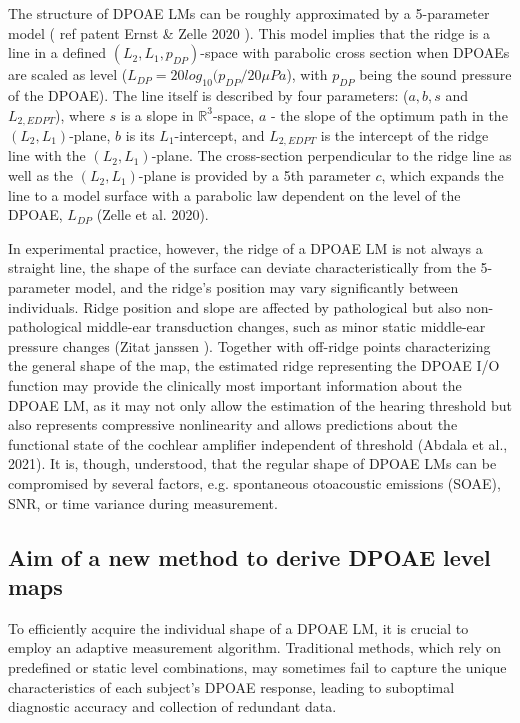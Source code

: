 \documentclass[journal,twoside,web]{ieeecolor2}
\begin{document}
The structure of DPOAE LMs can be roughly approximated by a 5-parameter model ( ref patent Ernst \& Zelle 2020 ). This model implies that the ridge is a line in a defined $(L_2, L_1, p_{DP})$-space with parabolic cross section when DPOAEs are scaled as level ($L_{DP}=20 log_{10} (p_{DP}/20 \mu Pa$), with $p_{DP}$ being the sound pressure of the DPOAE). The line itself is described by four parameters: ($a, b, s$ and $L_{2,EDPT}$), where $s$ is a slope in $\mathbb{R}^3$-space, $a$ - the slope of the optimum path in the $(L_2, L_1)$-plane, $b$ is its $L_1$-intercept, and $L_{2,EDPT}$ is the intercept of the ridge line with the $(L_2, L_1)$-plane. The cross-section perpendicular to the ridge line as well as the $(L_2, L_1)$-plane is provided by a 5th parameter $c$, which expands the line to a model surface with a parabolic law dependent on the level of the DPOAE, $L_{DP}$ (Zelle et al. 2020).

In experimental practice, however, the ridge of a DPOAE LM is not always a straight line, the shape of the surface can deviate characteristically from the 5-parameter model, and the ridge’s position may vary significantly between individuals. Ridge position and slope are affected by pathological but also non-pathological middle-ear transduction changes, such as minor static middle-ear pressure changes (Zitat janssen ). Together with off-ridge points characterizing the general shape of the map, the estimated ridge representing the DPOAE I/O function may provide the clinically most important information about the DPOAE LM, as it may not only allow the estimation of the hearing threshold but also represents compressive nonlinearity and allows predictions about the functional state of the cochlear amplifier independent of threshold (Abdala et al., 2021). It is, though, understood, that the regular shape of DPOAE LMs can be compromised by several factors, e.g. spontaneous otoacoustic emissions (SOAE), SNR, or time variance during measurement.


\subsection{Aim of a new method to derive DPOAE level maps}
To efficiently acquire the individual shape of a DPOAE LM, it is crucial to employ an adaptive measurement algorithm. Traditional methods, which rely on predefined or static level combinations, may sometimes fail to capture the unique characteristics of each subject’s DPOAE response, leading to suboptimal diagnostic accuracy and collection of redundant data. 
\end{document}
